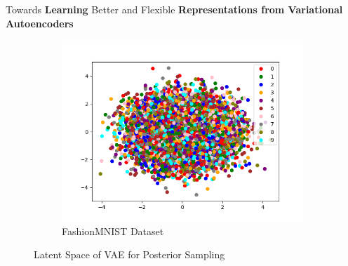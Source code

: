 \documentclass[hyperref={colorlinks,citecolor=blue,linkcolor=blue,urlcolor=blue}]{beamer}
\begin{document}
\begin{frame}{ Towards \textbf{Learning} Better and Flexible \textbf{Representations from Variational Autoencoders} \vspace{0.3em}}
\begin{figure}
\begin{subfigure}[b]{0.4\textwidth}
        \centering
        \includegraphics[width=\textwidth]{./Images/latent_FashionMNIST_VAE_Sampling.png}
        \caption{FashionMNIST Dataset}
    \end{subfigure}
    \caption{Latent Space of VAE for Posterior Sampling}
  \end{figure}
\end{frame}
\end{document}
